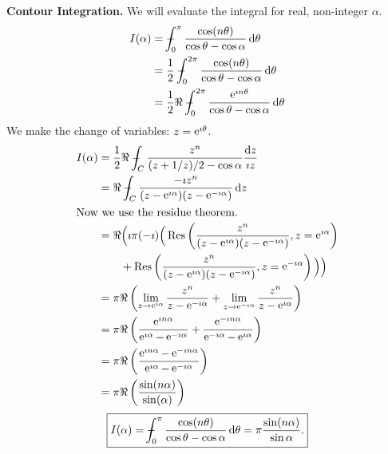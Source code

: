 {\begin{Solution}
  \textbf{Contour Integration.}
  We will evaluate the integral for real, non-integer $\alpha$. 
  \begin{align*}
    I(\alpha) 
    &= \pv\int_0^\pi \frac{ \cos(n \theta) }{ \cos \theta - \cos \alpha }
    \,\dd \theta \\
    &= \frac{1}{2} \pv\int_0^{2 \pi} \frac{ \cos(n \theta) }
    { \cos \theta - \cos \alpha } \,\dd \theta \\
    &= \frac{1}{2} \Re \pv\int_0^{2 \pi} \frac{ \e^{\imath n \theta} }
    { \cos \theta - \cos \alpha } \,\dd \theta 
  \end{align*}
  We make the change of variables: $z = \mathop{\mathrm{e}}\nolimits^{\imath \theta}$.
  \begin{align*}
    I(\alpha) 
    &= \frac{1}{2} \Re \pv\int_C \frac{ z^n }
    { (z + 1/z)/2 - \cos \alpha }  \frac{\dd z}{\imath z} \\
    &= \Re \pv\int_C \frac{ - \imath z^n }
    { (z - \e^{\imath \alpha})(z - \e^{- \imath \alpha}) } \,\dd z \\
    \intertext{Now we use the residue theorem.}
    &= \Re \Big( \imath \pi (-\imath) \Big(
    \Res \left( \frac{ z^n }{ (z - \e^{\imath \alpha})
        (z - \e^{- \imath \alpha}) }, z = \e^{\imath \alpha} \right) \\
    &\qquad + \Res \left( \frac{ z^n }{ (z - \e^{\imath \alpha})
        (z - \e^{- \imath \alpha}) }, z = \e^{-\imath \alpha} \right)
    \Big) \Big) \\
    &= \pi \Re \left(
      \lim_{z \to \e^{\imath \alpha}}
      \frac{ z^n }{ z - \e^{- \imath \alpha} }
      +\lim_{z \to \e^{-\imath \alpha}}
      \frac{ z^n }{ z - \e^{\imath \alpha} }
    \right) \\
    &= \pi \Re \left(
      \frac{ \e^{\imath n \alpha} }{ \e^{\imath \alpha} - \e^{- \imath \alpha} }
      + \frac{ \e^{-\imath n \alpha} }{ \e^{-\imath \alpha} - \e^{\imath \alpha} }
    \right) \\
    &= \pi \Re \left(
      \frac{ \e^{\imath n \alpha} - \e^{-\imath n \alpha} }
      { \e^{\imath \alpha} - \e^{- \imath \alpha} }
    \right) \\
    &= \pi \Re \left( \frac{ \sin(n \alpha) } { \sin(\alpha) } \right) 
  \end{align*}
  \[
  \boxed{
    I(\alpha) = - \negthickspace \negthickspace \negthickspace \negmedspace\int_0^\pi \frac{ \cos(n \theta) }{ \cos \theta - \cos \alpha }
    \,\mathrm{d} \theta = \pi \frac{ \sin(n \alpha) }{ \sin \alpha }.
    }
  \]
\end{Solution}









}
